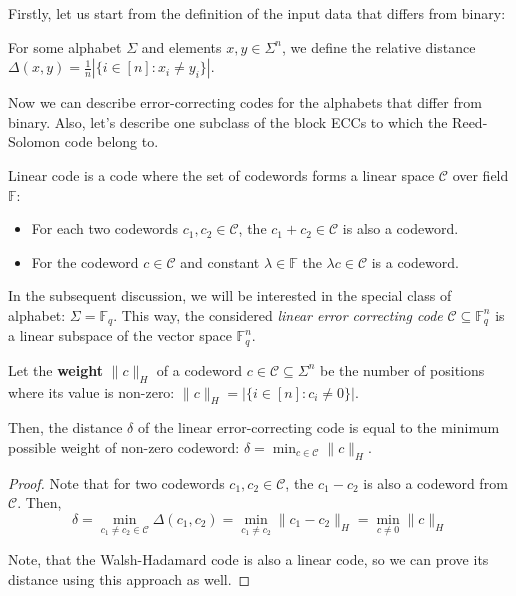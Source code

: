 \documentclass[../lecture-notes-148x210.tex]{subfiles}
\begin{document}
Firstly, let us start from the definition of the input data that differs from
binary:
\begin{definition}
For some alphabet $\Sigma$ and elements $x,y \in \Sigma^n$, we define the
relative distance $\Delta(x, y) = \frac{1}{n}\left|\{i \in [n]: x_i \neq y_i\}\right|$.
\end{definition}
Now we can describe error-correcting codes for the alphabets that differ from
binary. Also, let's describe one subclass of the block ECCs to which the
Reed-Solomon code belong to.
\begin{definition}
Linear code is a code where the set of codewords forms a linear space $\mathcal{C}$ over
field $\mathbb{F}$: 
\begin{itemize}
    \item[--] For each two codewords $c_1, c_2 \in \mathcal{C}$, the $c_1 + c_2 \in \mathcal{C}$ is also a codeword.
    \item[--] For the codeword $c \in \mathcal{C}$ and constant $\lambda \in
    \mathbb{F}$ the $\lambda c \in \mathcal{C}$ is a codeword.
\end{itemize}
\end{definition}

In the subsequent discussion, we will be interested in the special class of
alphabet: $\Sigma = \mathbb{F}_q$. This way, the considered
\emph{linear error correcting code} $\mathcal{C} \subseteq \mathbb{F}_q^n$ is a
linear subspace of the vector space $\mathbb{F}_q^n$.

\begin{theorem}
Let the \textbf{weight} $\|c\|_H$ of a codeword $c \in \mathcal{C} \subseteq
\Sigma^n$ be the number of positions where its value is non-zero: $\|c\|_H =
\left|\{i \in [n]: c_i \neq 0\}\right|$.

Then, the distance $\delta$ of the linear error-correcting code is equal to the
minimum possible weight of non-zero codeword: $\delta = \min_{c \in
\mathcal{C}}\|c\|_H$.
\end{theorem}
\begin{proof}
Note that for two codewords $c_1, c_2 \in \mathcal{C}$, the $c_1 - c_2$ is also
a codeword from $\mathcal{C}$. Then,
\begin{equation*}
    \delta = \min_{c_1 \neq c_2 \in \mathcal{C}} \Delta(c_1, c_2) = \min_{c_1 \neq c_2} \|c_1 - c_2\|_H = \min_{c \neq 0} \|c\|_H
\end{equation*} 

Note, that the Walsh-Hadamard code is also a linear code, so we can prove its
distance using this approach as well.
\end{proof}
\end{document}

